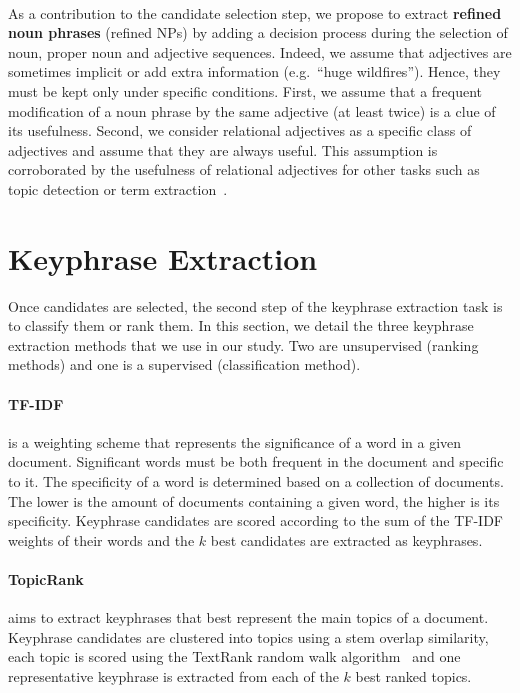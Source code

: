   \paragraph{}
  As a contribution to the candidate selection step, we propose to extract
  \textbf{refined noun phrases} (refined NPs) by adding a decision process
  during the selection of noun, proper noun and adjective sequences. Indeed,
  we assume that adjectives are sometimes implicit or add extra information
  (e.g.~``huge wildfires''). Hence, they must be kept only under specific
  conditions. First, we assume that a frequent modification of a noun phrase by
  the same adjective (at least twice) is a clue of its usefulness. Second, we
  consider relational adjectives as a specific class of adjectives and assume
  that they are always useful. This assumption is corroborated by the usefulness
  of relational adjectives for other tasks such as topic detection or term
  extraction~\cite{daille2001relationaladjectives}.

\section{Keyphrase Extraction}
\label{sec:keyphrase_extraction}
  Once candidates are selected, the second step of the keyphrase extraction task
  is to classify them or rank them. In this section, we detail the three
  keyphrase extraction methods that we use in our study. Two are unsupervised
  (ranking methods) and one is a supervised (classification method).

  \paragraph{TF-IDF~\textnormal{\cite{jones1972tfidf}}} is a weighting scheme
  that represents the significance of a word in a given document. Significant
  words must be both frequent in the document and specific to it. The
  specificity of a word is determined based on a collection of documents. The
  lower is the amount of documents containing a given word, the higher is its
  specificity. Keyphrase candidates are scored according to the sum of the
  TF-IDF weights of their words and the $k$ best candidates are extracted as
  keyphrases.

  \paragraph{TopicRank~\textnormal{\cite{bougouin2013topicrank}}} aims to
  extract keyphrases that best represent the main topics of a document.
  Keyphrase candidates are clustered into topics using a stem overlap
  similarity, each topic is scored using the TextRank random walk
  algorithm~\cite{mihalcea2004textrank} and one representative keyphrase is
  extracted from each of the $k$ best ranked topics.

